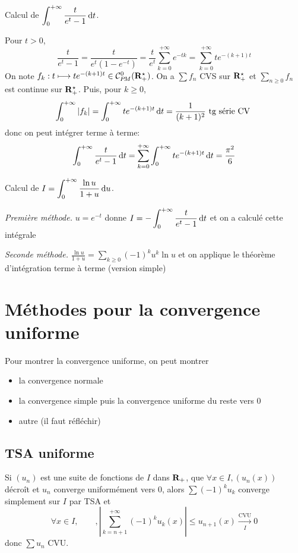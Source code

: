\begin{ex}
    Calcul de $\displaystyle \int_0^{+\infty}\frac{t}{e^t-1}\mathop{}\!\mathrm d t$.

Pour $t>0$,  \[
    \frac{t}{e^t-1}=\frac{t}{e^t(1-e^{-t})}=\frac{t}{e^t}\sum_{k=0}^{+\infty}e^{-tk}=\sum_{k=0}^{+\infty}te^{-(k+1)t}
\] 
On note $f_k:t\longmapsto te^{-(k+1)t} \in  \CPM(\R_+^\star)$. On a $\sum f_n$ CVS sur $\mathbf R_+^\star$ et $\sum_{n\geq 0}f_n$ est  continue sur  $ \mathbf R_+^\star$. Puis, pour $k\geq 0$,  \[
    \int_0^{+\infty}|f_k|= \int_{0}^{+\infty} te^{-(k+1)t}\mathop{}\!\mathrm d t = \frac{1}{(k+1)^2} \text{ tg série CV }
\] 
donc on peut intégrer terme à terme: \[
    \int_{0}^{+\infty} \frac{t}{e^t-1}\mathop{}\!\mathrm d t=\sum_{k=0}^{+\infty}\int_0^{+\infty}te^{-(k+1)t}\mathop{}\!\mathrm d t=  \frac{\pi ^2}{6} 
\] 
\end{ex}

\begin{ex}
Calcul de $\displaystyle I= \int_{0}^{+\infty} \frac{\ln u}{1+u}\mathop{}\!\mathrm d u $.

\emph{Première méthode.} $u=e^{-t}$ donne $\displaystyle I=- \int_{0}^{+\infty}  \frac{t}{e^t-1}\mathop{}\!\mathrm d t$ et on a calculé cette intégrale

\emph{Seconde méthode.} $\displaystyle \frac{\ln u}{1+u}=\sum_{k\geq 0}(-1)^ku^k\ln u$ et on applique le théorème d'intégration terme à terme (version simple)
\end{ex}

\section{Méthodes pour la convergence uniforme}

Pour montrer la convergence uniforme, on peut montrer \begin{itemize}
    \item la convergence normale
    \item la convergence simple puis la convergence uniforme du reste vers $0$
    \item autre (il faut réfléchir)
\end{itemize}

\subsection{TSA uniforme}

Si $(u_n)$ est une suite de fonctions de  $I$ dans  $ \mathbf R_+$, que $\forall  x \in  I, (u_n(x))$ décroît et $u_n$ converge uniformément vers  $0$, alors  $\sum (-1)^ku_k$ converge simplement sur  $I$ par TSA et  \[
    \forall  x \in  I, \qquad , \left| \sum_{k=n+1}^{+\infty}(-1)^ku_k(x) \right|\leq u_{n+1}(x) \xrightarrow[I]{\text{CVU}}0
\] 
donc $\sum u_n$ CVU. 

